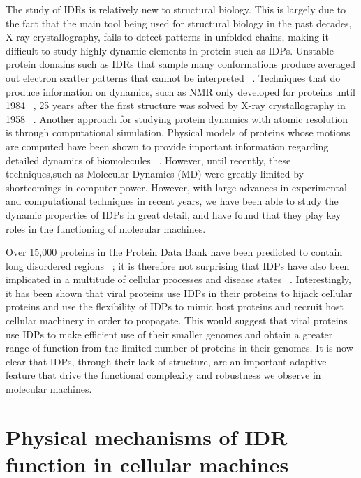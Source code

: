 The study of IDRs is relatively new to structural biology. This is largely due to the fact that the main tool being used for structural biology in the past decades, X-ray crystallography, fails to detect patterns in unfolded chains, making it difficult to study highly dynamic elements in protein such as IDPs. Unstable protein domains such as IDRs that sample many conformations produce averaged out electron scatter patterns that cannot be interpreted ~\cite{putnam2007x}. Techniques that  do produce information  on dynamics,  such as NMR only developed for proteins  until 1984 ~\cite{wuthrich2001way}, 25 years after the first structure was solved by X-ray crystallography  in 1958 ~\cite{kendrew1958three}.  Another approach for studying protein dynamics with atomic resolution is through computational simulation.  Physical models of proteins whose motions are computed \silico have been shown to provide important information regarding detailed dynamics of biomolecules ~\cite{karplus2002molecular}. However, until recently, these techniques,such as Molecular Dynamics (MD) were greatly limited by shortcomings in computer power. However, with large advances  in experimental  and computational techniques  in recent years, we have been able to study the dynamic properties  of IDPs in great detail, and have found that  they play key roles in the functioning of molecular machines.

Over 15,000 proteins in the Protein Data Bank have been predicted to contain long disordered regions ~\cite{romero1998thousands}; it is therefore not surprising that  IDPs have also been implicated  in a multitude of cellular processes and disease states ~\cite{uversky2008intrinsically}.  Interestingly, it has been shown that viral proteins use IDPs in their proteins to hijack cellular proteins and use the flexibility of IDPs to mimic host proteins and recruit host cellular machinery in order to propagate.\cite{davey2011viruses} This would suggest that viral proteins use IDPs to make efficient use of their smaller genomes and obtain a greater range of function from the limited number of proteins in their genomes. It is now clear that IDPs, through their lack of structure, are an important adaptive feature that drive the functional complexity and robustness we observe in molecular machines. \\

\section{Physical mechanisms of IDR function in cellular machines}

